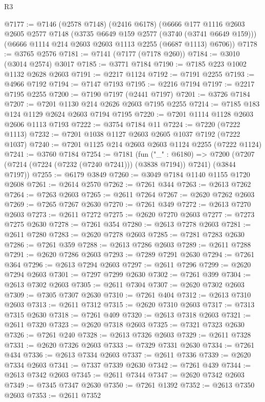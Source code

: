 \begin{lexlean}{R3}
\begin{coremodule}
@7177 := @7146
    (@2578 @7148)
    (@2416 @6178)
    (@6666
      @177
      @1116
      @2603
      @2605
      @2577
      @7148
      (@3735 @6649 @159 @2577 (@3740 (@3741 @6649 @159)))
      (@6666 @1114 @214 @2603 @2603 @1113 @2255 (@6687 @1113) @6706))
@7178 := @3765 @2576
@7181 := @7141 (@7177 (@7178 @260))
@7184 := @3010 (@3014 @2574) @3017
@7185 := @3771 @7184
@7190 := @7185 @223 @1002 @1132 @2628 @2603
@7191 := @2217 @1124
@7192 := @7191 @2255
@7193 := @4966 @7192
@7194 := @7147 @7193
@7195 := @2216 @7194
@7197 := @2217 @7195 @2255
@7200 := @7190 @7197 (@2441 @7197)
@7201 := @3726 @7184
@7207 := @7201 @1130 @214 @2626 @2603 @7195 @2255
@7214 := @7185 @183 @124 @1129 @2624 @2603 @7194 @7195
@7220 := @7201 @1114 @1128 @2603 @2606 @1113 @7193
@7222 := @3754 @7184 @11
@7224 := @7220 (@7222 @1113)
@7232 := @7201 @1038 @1127 @2603 @2605 @1037 @7192 (@7222 @1037)
@7240 := @7201 @1125 @214 @2603 @2603 @1124 @2255 (@7222 @1124)
@7241 := @3760 @7184
@7254 := @7181
    (fun ("_" : @6180) =>
    @7200 (@7207 (@7214 (@7224 (@7232 (@7240 @7241))) (@3838 @7194)) @7241) (@3844 @7197))
@7255 := @6179 @3849
@7260 := @3049 @7184 @1140 @1155 @1720 @2608
@7261 := @2614 @2570
@7262 := @7261 @344
@7263 := @2613 @7262
@7264 := @7263 @2603
@7265 := @2611 @7264
@7267 := @2620 @7262 @2603
@7269 := @7265 @7267 @2630
@7270 := @7261 @349
@7272 := @2613 @7270 @2603
@7273 := @2611 @7272
@7275 := @2620 @7270 @2603
@7277 := @7273 @7275 @2630
@7278 := @7261 @354
@7280 := @2613 @7278 @2603
@7281 := @2611 @7280
@7283 := @2620 @7278 @2603
@7285 := @7281 @7283 @2630
@7286 := @7261 @359
@7288 := @2613 @7286 @2603
@7289 := @2611 @7288
@7291 := @2620 @7286 @2603
@7293 := @7289 @7291 @2630
@7294 := @7261 @364
@7296 := @2613 @7294 @2603
@7297 := @2611 @7296
@7299 := @2620 @7294 @2603
@7301 := @7297 @7299 @2630
@7302 := @7261 @399
@7304 := @2613 @7302 @2603
@7305 := @2611 @7304
@7307 := @2620 @7302 @2603
@7309 := @7305 @7307 @2630
@7310 := @7261 @404
@7312 := @2613 @7310 @2603
@7313 := @2611 @7312
@7315 := @2620 @7310 @2603
@7317 := @7313 @7315 @2630
@7318 := @7261 @409
@7320 := @2613 @7318 @2603
@7321 := @2611 @7320
@7323 := @2620 @7318 @2603
@7325 := @7321 @7323 @2630
@7326 := @7261 @240
@7328 := @2613 @7326 @2603
@7329 := @2611 @7328
@7331 := @2620 @7326 @2603
@7333 := @7329 @7331 @2630
@7334 := @7261 @434
@7336 := @2613 @7334 @2603
@7337 := @2611 @7336
@7339 := @2620 @7334 @2603
@7341 := @7337 @7339 @2630
@7342 := @7261 @439
@7344 := @2613 @7342 @2603
@7345 := @2611 @7344
@7347 := @2620 @7342 @2603
@7349 := @7345 @7347 @2630
@7350 := @7261 @1392
@7352 := @2613 @7350 @2603
@7353 := @2611 @7352

\end{coremodule}
\end{lexlean}
